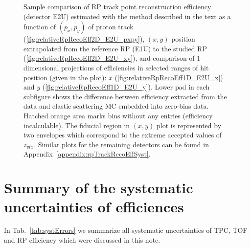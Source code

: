 \begin{figure}[h]
{\begin{subfigure}[b]{\linewidth}
		\end{subfigure}
	}
	\caption[Coparison of estimated RP track point reconstruction efficiency in 2D and 1D (detector E2U).]%
	{Sample comparison of RP track point reconstruction efficiency (detector E2U) estimated with the method described in the text as a function of $(p_{x},p_{y})$ of proton track (\ref{fig:relativeRpRecoEff2D_E2U_pxpy}), $(x,y)$ position extrapolated from the reference RP (E1U) to the studied RP (\ref{fig:relativeRpRecoEff2D_E2U_xy}), and comparison of 1-dimensional projections of efficiencies in selected ranges of hit position (given in the plot): $x$ (\ref{fig:relativeRpRecoEff1D_E2U_x}) and $y$ (\ref{fig:relativeRpRecoEff1D_E2U_y}). Lower pad in each subfigure shows the difference between efficiency extracted from the data and elastic scattering MC embedded into zero-bias data. Hatched orange area marks bins without any entries (efficiency incalculable). The fiducial region in $(x,y)$ plot is represented by two envelopes which correspond to the extreme accepted values of $z_{vtx}$. Similar plots for the remaining detectors can be found in Appendix~\ref{appendix:rpTrackRecoEffSyst}.%
	}\label{fig:relativeRpRecoEff_E2U}
\end{figure}



\section{Summary of the systematic uncertainties of efficiences}\label{sec:systErrorSummary}

In Tab.~\ref{tab:systErrors} we summarize all systematic uncertainties of TPC, TOF and RP efficiency which were discussed in this note.

